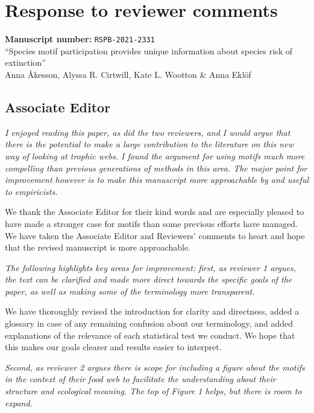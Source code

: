 \documentclass[12pt]{article}
\newcommand{\us}{\rm \setlength{\leftskip}{0.3cm} \setlength{\rightskip}{0.3cm}}
\newcommand{\them}{\it \setlength{\leftskip}{0cm} \setlength{\rightskip}{0cm}}
\begin{document}
 

\section*{Response to reviewer comments}

\begin{flushleft}
\textbf{Manuscript number: } \texttt{RSPB-2021-2331} \\
``Species motif participation provides unique information about species risk of extinction''\\
Anna {\AA}kesson, Alyssa R. Cirtwill, Kate L. Wootton \& Anna Ekl\"of
\end{flushleft}




\subsection*{Associate Editor}
    \them
    I enjoyed reading this paper, as did the two reviewers, and I would argue that there is the potential to make a large contribution to the literature on this new way of looking at trophic webs. I found the argument for using motifs much more compelling than previous generations of methods in this area. The major point for improvement however is to make this manuscript more approachable by and useful to empiricists.  
    
    \us
    We thank the Associate Editor for their kind words and are especially pleased to have made a stronger case for motifs than some previous efforts have managed. We have taken the Associate Editor and Reviewers' comments to heart and hope that the revised manuscript is more approachable.
    
    \them 
    The following highlights key areas for improvement: first, as reviewer 1 argues, the text can be clarified and made more direct towards the specific goals of the paper, as well as making some of the terminology more transparent.  
    
    \us
    We have thoroughly revised the introduction for clarity and directness, added a glossary in case of any remaining confusion about our terminology, and added explanations of the relevance of each statistical test we conduct. We hope that this makes our goals clearer and results easier to interpret. 
    
    \them
    Second, as reviewer 2 argues there is scope for including a figure about the motifs in the context of their food web to facilitate the understanding about their structure and ecological meaning. The top of Figure 1 helps, but there is room to expand.  
    
\end{document}
